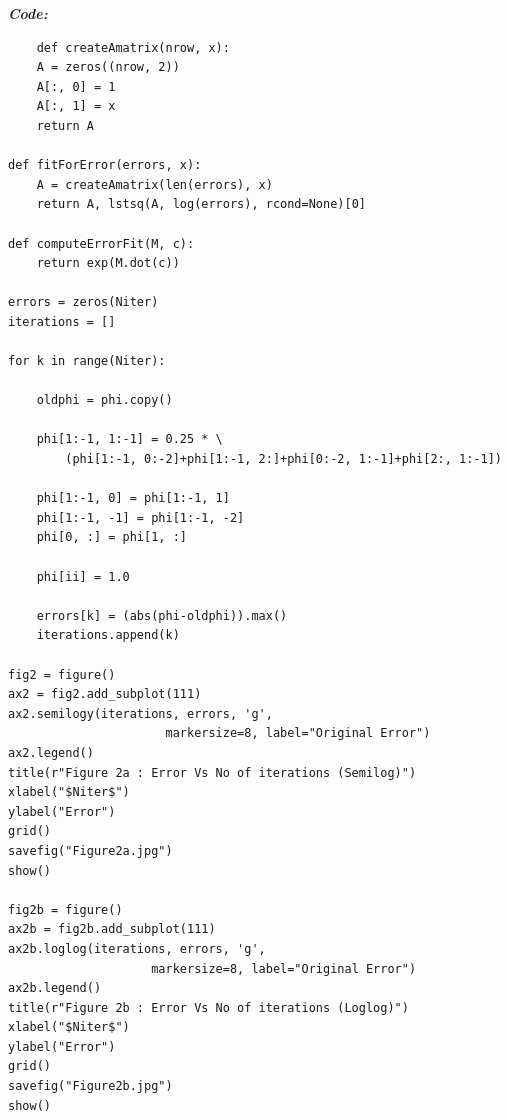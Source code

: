 \documentclass[11pt, a4paper]{article}
\begin{document}
\textit{\textbf{Code:}}
   \begin{lstlisting}
    def createAmatrix(nrow, x):
    A = zeros((nrow, 2))  
    A[:, 0] = 1
    A[:, 1] = x
    return A

def fitForError(errors, x):
    A = createAmatrix(len(errors), x)
    return A, lstsq(A, log(errors), rcond=None)[0]

def computeErrorFit(M, c):
    return exp(M.dot(c))

errors = zeros(Niter)  
iterations = []  

for k in range(Niter):
    
    oldphi = phi.copy()

    phi[1:-1, 1:-1] = 0.25 * \
        (phi[1:-1, 0:-2]+phi[1:-1, 2:]+phi[0:-2, 1:-1]+phi[2:, 1:-1])

    phi[1:-1, 0] = phi[1:-1, 1]  
    phi[1:-1, -1] = phi[1:-1, -2]  
    phi[0, :] = phi[1, :]  
    
    phi[ii] = 1.0

    errors[k] = (abs(phi-oldphi)).max()
    iterations.append(k)

fig2 = figure()
ax2 = fig2.add_subplot(111)
ax2.semilogy(iterations, errors, 'g', 
                      markersize=8, label="Original Error")
ax2.legend()
title(r"Figure 2a : Error Vs No of iterations (Semilog)")
xlabel("$Niter$")
ylabel("Error")
grid()
savefig("Figure2a.jpg")
show()

fig2b = figure()
ax2b = fig2b.add_subplot(111)
ax2b.loglog(iterations, errors, 'g', 
                    markersize=8, label="Original Error")
ax2b.legend()
title(r"Figure 2b : Error Vs No of iterations (Loglog)")
xlabel("$Niter$")
ylabel("Error")
grid()
savefig("Figure2b.jpg")
show()
    
         \end{lstlisting}
     \newpage
\end{document}

